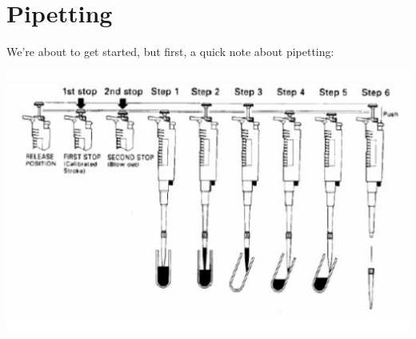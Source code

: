 \documentclass[letterpaper]{article}
\newcommand{\uL}{\micro{}L}
\newcommand{\Dilution}[4]{
\subsection{#2}
\begin{enumerate}
\item{Vortex #2 stock}
\item{Pipette #1\uL{} #2 into a PCR Tube}
\item{Pipette #3\uL{} #4 into solution}
\item{Vortex until mixed}
\end{enumerate}
}
\begin{document}

\section{Pipetting}
We're about to get started, but first, a quick note about pipetting:

\begin{center}
\includegraphics[width=.6\textwidth]{Capture.JPG}
\end{center}
\end{document}
